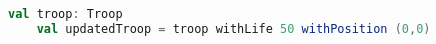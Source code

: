 \begin{lstlisting}[language=Scala, label=code:troopupdate, caption= Aggiornamento di una troop.]
    val troop: Troop
    val updatedTroop = troop withLife 50 withPosition (0,0)
\end{lstlisting}